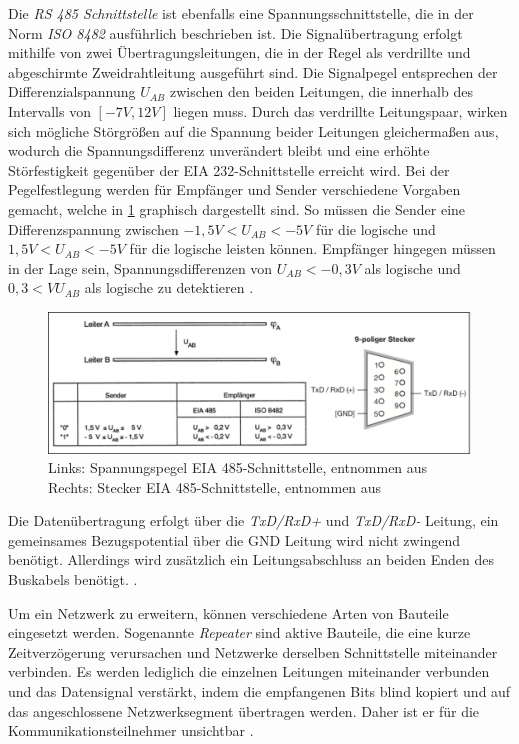 Die \textit{RS 485 Schnittstelle} ist ebenfalls eine Spannungsschnittstelle, die in der Norm \textit{ISO 8482} ausführlich beschrieben ist. Die Signalübertragung erfolgt mithilfe von zwei Übertragungsleitungen, die in der Regel als verdrillte und abgeschirmte Zweidrahtleitung ausgeführt sind. Die Signalpegel entsprechen der Differenzialspannung $U_{AB}$ zwischen den beiden Leitungen, die innerhalb des Intervalls von $[-7V,12V]$ liegen muss. Durch das verdrillte Leitungspaar, wirken sich mögliche Störgrößen auf die Spannung beider Leitungen gleichermaßen aus, wodurch die Spannungsdifferenz unverändert bleibt und eine erhöhte Störfestigkeit gegenüber der EIA 232-Schnittstelle erreicht wird.
Bei der Pegelfestlegung werden für Empfänger und Sender verschiedene Vorgaben gemacht, welche in \ref{fig:rs485} graphisch dargestellt sind. So müssen die Sender eine Differenzspannung zwischen $-1,5V<U_{AB}<-5V$ für die logische \Gob und $1,5V<U_{AB}<-5V$ für die logische \Gob leisten können. Empfänger hingegen müssen in der Lage sein, Spannungsdifferenzen von $U_{AB}<-0,3V$ als logische \Gob und $0,3<VU_{AB}$ als logische \Gob zu detektieren \cite[S.~59ff.]{schn06}.

\begin{figure}
\centering
\includegraphics[width=\textwidth]{abbildungen/20160314_rs485}
\caption[Spannungspegel und Stecker der EIA 485-Schnittstelle]{Links: Spannungspegel EIA 485-Schnittstelle, entnommen aus \cite[S.~60]{schn06} \newline Rechts: Stecker EIA 485-Schnittstelle, entnommen aus \cite[S.~19]{sch08}}
\label{fig:rs485}
\end{figure}

Die Datenübertragung erfolgt über die \textit{TxD/RxD+} und \textit{TxD/RxD-} Leitung, ein gemeinsames Bezugspotential über die GND Leitung wird nicht zwingend benötigt. Allerdings wird zusätzlich ein Leitungsabschluss an beiden Enden des Buskabels benötigt.  \cite[S.~19f.]{sch08}.

Um ein Netzwerk zu erweitern, können verschiedene Arten von Bauteile eingesetzt werden. Sogenannte \textit{Repeater} sind aktive Bauteile, die eine kurze Zeitverzögerung verursachen und Netzwerke derselben Schnittstelle miteinander verbinden. Es werden lediglich die einzelnen Leitungen miteinander verbunden und das Datensignal verstärkt, indem die empfangenen Bits blind kopiert und auf das angeschlossene Netzwerksegment übertragen werden. Daher ist er für die Kommunikationsteilnehmer unsichtbar \cite[S.~79f.]{schn06}.

